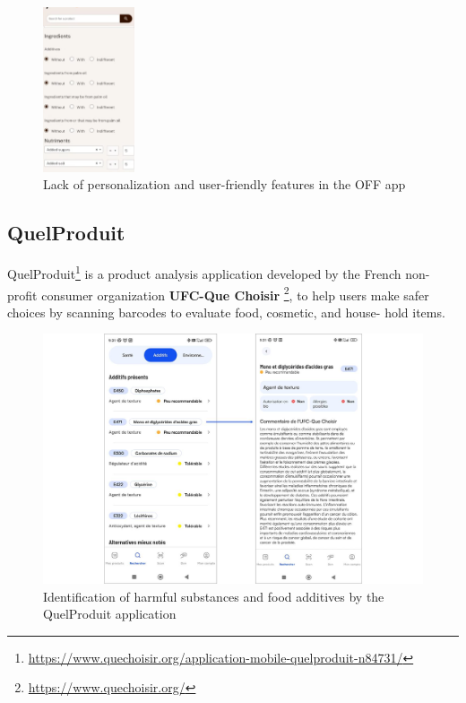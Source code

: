 \begin{figure}[H]
    \includegraphics[width=0.24\textwidth]{images/OFF-03.png}
    \caption{Lack of personalization and user-friendly features in the OFF app}
    \label{fig:OFF_app}
\end{figure}

\subsection{QuelProduit}
\par QuelProduit\footnote{\url{https://www.quechoisir.org/application-mobile-quelproduit-n84731/}} is a product 
analysis application developed by the French non-profit consumer organization \textbf{UFC-Que Choisir} \footnote{\url{https://www.quechoisir.org/}}, to help users make
safer choices by scanning barcodes to evaluate food, cosmetic, and house-
hold items. 

 \begin{center}
\begin{figure}[H]
\includegraphics[scale=0.19]{images/quelproduit.jpg}
\caption{Identification of harmful substances and food additives by the QuelProduit application}
\label{fig:queChoisir}
\end{figure}
\end{center}

